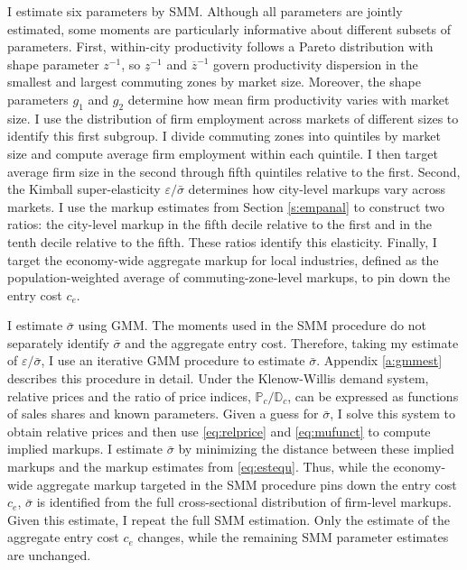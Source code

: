 I estimate six parameters by SMM. Although all parameters are jointly estimated, some moments are particularly informative about different subsets of parameters. First, within-city productivity follows a Pareto distribution with shape parameter $z^{-1}$, so $\underline{z}^{-1}$ and $\overline{z}^{-1}$ govern productivity dispersion in the smallest and largest commuting zones by market size. Moreover, the shape parameters $g_1$ and $g_2$ determine how mean firm productivity varies with market size. I use the distribution of firm employment across markets of different sizes to identify this first subgroup. I divide commuting zones into quintiles by market size and compute average firm employment within each quintile. I then target average firm size in the second through fifth quintiles relative to the first. Second, the Kimball super-elasticity $\varepsilon/\bar{\sigma}$ determines how city-level markups vary across markets. I use the markup estimates from Section \ref{s:empanal} to construct two ratios: the city-level markup in the fifth decile relative to the first and in the tenth decile relative to the fifth. These ratios identify this elasticity. Finally, I target the economy-wide aggregate markup for local industries, defined as the population-weighted average of commuting-zone-level markups, to pin down the entry cost $c_e$.

I estimate $\bar{\sigma}$ using GMM. The moments used in the SMM procedure do not separately identify $\bar{\sigma}$ and the aggregate entry cost. Therefore, taking my estimate of $\varepsilon/\bar{\sigma}$, I use an iterative GMM procedure to estimate $\bar{\sigma}$. Appendix \ref{a:gmmest} describes this procedure in detail. Under the Klenow-Willis demand system, relative prices and the ratio of price indices, $\mathbb{P}_c/\mathbb{D}_c$, can be expressed as functions of sales shares and known parameters. Given a guess for $\bar{\sigma}$, I solve this system to obtain relative prices and then use \eqref{eq:relprice} and \eqref{eq:mufunct} to compute implied markups. I estimate $\bar{\sigma}$ by minimizing the distance between these implied markups and the markup estimates from \eqref{eq:estequ}. Thus, while the economy-wide aggregate markup targeted in the SMM procedure pins down the entry cost $c_e$, $\bar{\sigma}$ is identified from the full cross-sectional distribution of firm-level markups. Given this estimate, I repeat the full SMM estimation. Only the estimate of the aggregate entry cost $c_e$ changes, while the remaining SMM parameter estimates are unchanged.

